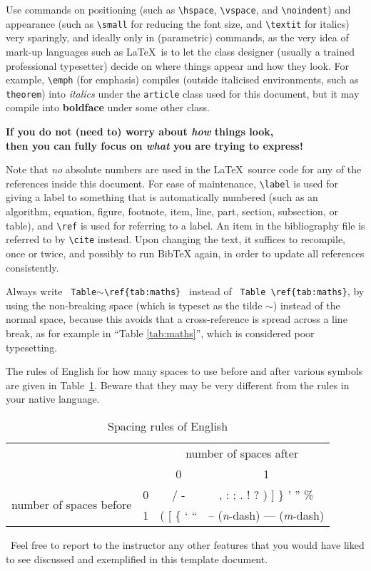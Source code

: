 Use commands on positioning (such as \verb|\hspace|, \verb|\vspace|,
and \verb|\noindent|) and appearance (such as \verb|\small| for
reducing the font size, and \verb|\textit| for italics) very
sparingly, and ideally only in (parametric) commands, as the very idea
of mark-up languages such as \LaTeX\ is to let the class designer
(usually a trained professional typesetter) decide on where things
appear and how they look.  For example, \verb|\emph| (for emphasis)
compiles (outside italicised environments, such as \texttt{theorem})
into \textit{italics} under the \texttt{article} class used for this
document, but it may compile into \textbf{boldface} under some other
class.
\begin{center}
  \textbf{If you do not (need to) worry about \emph{how} things look, \\
    then you can fully focus on \emph{what} you are trying to
    express!}
\end{center}

Note that \emph{no} absolute numbers are used in the \LaTeX\ source
code for any of the references inside this document.  For ease of
maintenance, \verb|\label| is used for giving a label to something
that is automatically numbered (such as an algorithm, equation,
figure, footnote, item, line, part, section, subsection, or table),
and \verb|\ref| is used for referring to a label.  An item in the
bibliography file is referred to by \verb|\cite| instead.  Upon
changing the text, it suffices to recompile, once or twice, and
possibly to run BibTeX again, in order to update all references
consistently.

Always write
%
\verb| Table|$\sim$\verb|\ref{tab:maths} |
%
instead of
%
\verb| Table \ref{tab:maths}|,
%
by using the non-breaking space (which is typeset as the tilde $\sim$)
instead of the normal space, because this avoids that a
cross-reference is spread across a line break, as for example in
``Table \ref{tab:maths}'', which is considered poor typesetting.

The rules of English for how many spaces to use before and after
various symbols are given in Table~\ref{tab:spacing}.  Beware that
they may be very different from the rules in your native language.

\begin{table}[h]
  \centering
  \begin{tabular}{|c|c|c|c|}
    \cline{3-4}
    \multicolumn{2}{c|}{} & \multicolumn{2}{c|}{number of spaces after} \\
    \cline{3-4}
    \multicolumn{2}{c|}{} & 0 & 1 \\
    \hline
    \multirow{2}{*}{number of spaces before} & 0 & / - & , : ; . ! ?
    ) ] \} ' '' \% \\
    \cline{2-4}
    & 1 & ( [ \{ ` `` & -- (\emph{n}-dash) --- (\emph{m}-dash) \\
    \hline
  \end{tabular}
  \caption{Spacing rules of English}
  \label{tab:spacing}
\end{table}

\vfill

\noindent
\handpoint\ Feel free to report to the instructor any other features
that you would have liked to see discussed and exemplified in this
template document.
